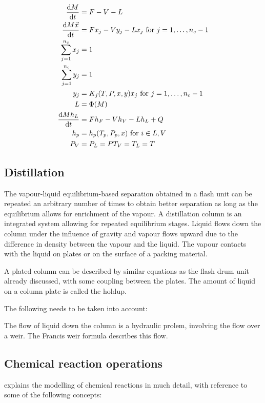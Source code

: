 \begin{align}
  \frac{\mathrm{d} M}{\mathrm{d} t} &= F - V - L \\
  \frac{\mathrm{d} M\vec{x}}{\mathrm{d} t} &= Fx_j - Vy_j - Lx_j \text{ for } j = 1,\dots,n_c-1  \\
  \sum_{j=1}^{n_c} x_j &= 1 \\
  \sum_{j=1}^{n_c} y_j &= 1 \\
  y_j &= K_j(T, P, x, y)x_j \text{ for } j = 1,\dots,n_c-1  \\
  L &= \Phi(M) \\
  \frac{\mathrm{d} Mh_L}{\mathrm{d} t} &= Fh_F - Vh_V - Lh_L + Q \\
  h_p &= h_p(T_p, P_p, x) \text{ for } i \in {L, V} \\
  P_V &= P_L = P
  T_V=T_L=T
\end{align}

\subsection{Distillation}

The vapour-liquid equilibrium-based separation obtained in a flash unit can be
repeated an arbitrary number of times to obtain better separation as
long as the equilibrium allows for enrichment of the vapour.  A
distillation column is an integrated system allowing for repeated
equilibrium stages.  Liquid flows down the column under the influence
of gravity and vapour flows upward due to the difference in density
between the vapour and the liquid.  The vapour contacts with the
liquid on plates or on the surface of a packing material.  

A plated column can be described by similar equations as the flash
drum unit already discussed, with some coupling between the plates.
The amount of liquid on a column plate is called the holdup.

The following needs to be taken into account:



The flow of liquid down the column is a hydraulic prolem, involving
the flow over a weir.  The Francis weir formula describes this flow.


\subsection{Chemical reaction operations}
\citet[347]{cellier1991continuous} explains the modelling of chemical reactions in much detail, with reference to some of the following concepts:

